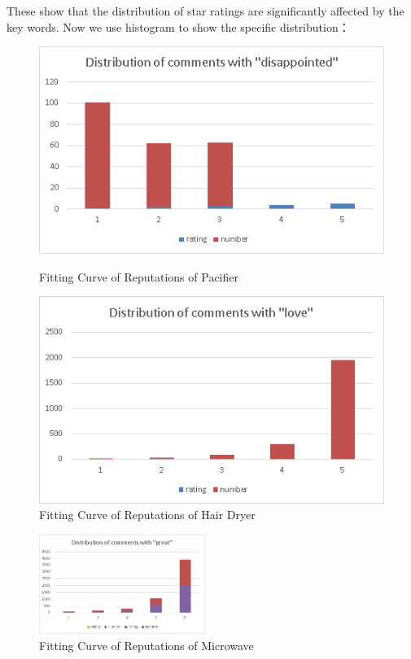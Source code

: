 \documentclass{mcmthesis}
\begin{document}
These show that the distribution of star ratings are significantly affected by the key words. Now we use histogram to show the specific distribution：
\\
\begin{figure}[H]
	\begin{minipage}[t]{0.48\linewidth}	
	\centering
	\includegraphics[width=1.0\textwidth]{figures/dis.png}
	\caption{Fitting Curve of Reputations of Pacifier}	  
	\end{minipage}
	\hfill
	\begin{minipage}[t]{0.48\linewidth}	
	\centering
	\includegraphics[width=1.0\textwidth]{figures/love.png}
	\caption{Fitting Curve of Reputations of Hair Dryer}	  
	\end{minipage}
	\end{figure}
	\begin{figure}[H]
	\centering
	\includegraphics[width=0.48\textwidth]{figures/great.png}
	\caption{Fitting Curve of Reputations of Microwave}	  
	\end{figure}
\end{document}
